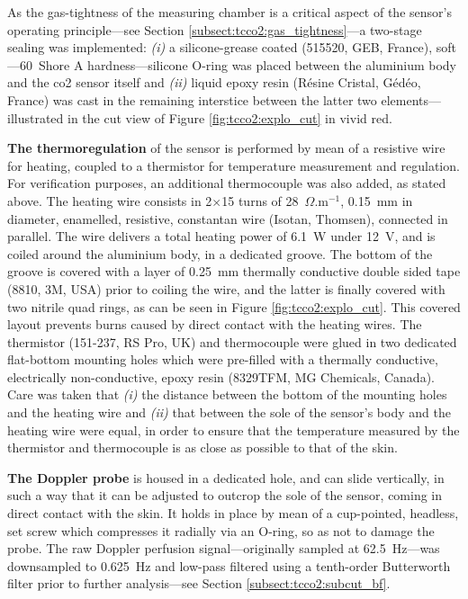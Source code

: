 As the gas-tightness of the measuring chamber is a critical aspect of the sensor's operating principle---see Section \ref{subsect:tcco2:gas_tightness}---a two-stage sealing was implemented: \textit{(i)} a silicone-grease coated (515520, GEB, France), soft---60~Shore A hardness---silicone O-ring was placed between the aluminium body and the \gls{co2} sensor itself and \textit{(ii)} liquid epoxy resin (Résine Cristal, Gédéo, France) was cast in the remaining interstice between the latter two elements---illustrated in the cut view of Figure \ref{fig:tcco2:explo_cut} in vivid red.

\textbf{The thermoregulation} of the sensor is performed by mean of a resistive wire for heating, coupled to a thermistor for temperature measurement and regulation. For verification purposes, an additional thermocouple was also added, as stated above. The heating wire consists in 2$\times$15 turns of 28~$\Omega$.m$^{-1}$, 0.15~mm in diameter, enamelled, resistive, constantan wire (Isotan, Thomsen), connected in parallel. The wire delivers a total heating power of 6.1~W under 12~V, and is coiled around the aluminium body, in a dedicated groove. The bottom of the groove is covered with a layer of 0.25~mm thermally conductive double sided tape (8810, 3M, USA) prior to coiling the wire, and the latter is finally covered with two nitrile quad rings, as can be seen in Figure \ref{fig:tcco2:explo_cut}. This covered layout prevents burns caused by direct contact with the heating wires. The thermistor (151-237, RS Pro, UK) and thermocouple were glued in two dedicated flat-bottom mounting holes which were pre-filled with a thermally conductive, electrically non-conductive, epoxy resin (8329TFM, MG Chemicals, Canada). Care was taken that \textit{(i)} the distance between the bottom of the mounting holes and the heating wire and \textit{(ii)} that between the sole of the sensor's body and the heating wire were equal, in order to ensure that the temperature measured by the thermistor and thermocouple is as close as possible to that of the skin.

\textbf{The Doppler probe} is housed in a dedicated hole, and can slide vertically, in such a way that it can be adjusted to outcrop the sole of the sensor, coming in direct contact with the skin. It holds in place by mean of a cup-pointed, headless, set screw which compresses it radially via an O-ring, so as not to damage the probe. The raw Doppler perfusion signal---originally sampled at 62.5~Hz---was downsampled to 0.625~Hz and low-pass filtered using a tenth-order Butterworth filter prior to further analysis---see Section \ref{subsect:tcco2:subcut_bf}.

